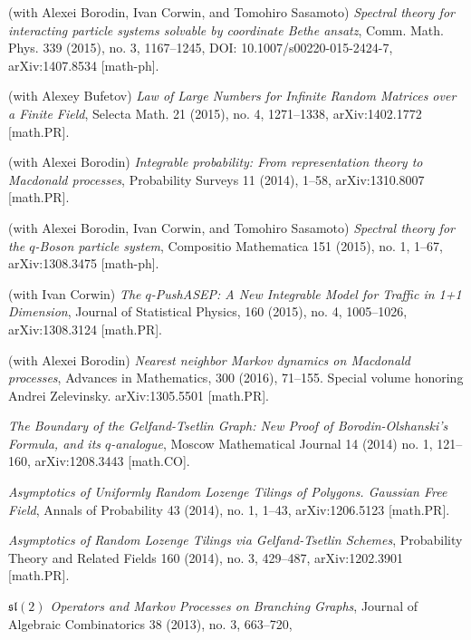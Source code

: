 \documentclass[letterpaper,11pt]{article}
\begin{document}
\begin{etaremune}
	\item
	      (with Alexei Borodin, Ivan Corwin, and Tomohiro Sasamoto)
	      \emph{Spectral theory for interacting particle systems solvable
		      by coordinate Bethe ansatz},
	      Comm. Math. Phys. 339 (2015), no. 3, 1167--1245, DOI:
	      10.1007/s00220-015-2424-7, arXiv:1407.8534 [math-ph].
	\item
	      (with Alexey Bufetov)
	      \emph{Law of Large Numbers for Infinite Random Matrices over a
		      Finite Field},
	      Selecta Math. 21 (2015), no. 4, 1271--1338, arXiv:1402.1772
	      [math.PR].
	\item
	      (with Alexei Borodin)
	      \emph{Integrable probability: From representation theory to
		      Macdonald processes},
	      Probability Surveys 11 (2014), 1--58, arXiv:1310.8007 [math.PR].
	\item
	      (with Alexei Borodin, Ivan Corwin, and Tomohiro Sasamoto)
	      \emph{Spectral theory for the $q$-Boson particle system},
	      Compositio Mathematica 151 (2015), no. 1, 1--67, arXiv:1308.3475
	      [math-ph].
	\item
	      (with Ivan Corwin)
	      \emph{The $q$-PushASEP: A New Integrable Model for Traffic in
		      1+1 Dimension},
	      Journal of Statistical Physics, 160 (2015), no. 4, 1005--1026,
	      arXiv:1308.3124 [math.PR].
	\item
	      (with Alexei Borodin)
	      \emph{Nearest neighbor Markov dynamics on Macdonald processes},
	      Advances in Mathematics, 300 (2016), 71--155. Special volume
	      honoring Andrei Zelevinsky. arXiv:1305.5501 [math.PR].
	\item
	      \emph{The Boundary of the Gelfand-Tsetlin Graph: New Proof of
		      Borodin-Olshanski's Formula, and its $q$-analogue},
	      Moscow Mathematical Journal 14 (2014) no. 1, 121--160,
	      arXiv:1208.3443 [math.CO].
	\item
	      \emph{Asymptotics of Uniformly Random Lozenge Tilings of
		      Polygons. Gaussian Free Field},
	      Annals of Probability 43 (2014), no. 1, 1--43, arXiv:1206.5123
	      [math.PR].
	\item
	      \emph{Asymptotics of Random Lozenge Tilings via Gelfand-Tsetlin
		      Schemes},
	      Probability Theory and Related Fields 160 (2014), no. 3,
	      429--487, arXiv:1202.3901 [math.PR].
	\item
	      \emph{$\mathfrak{sl}(2)$
		      Operators and Markov Processes on Branching Graphs},
	      Journal of Algebraic Combinatorics 38 (2013), no. 3, 663--720,

\end{etaremune}
\end{document}

